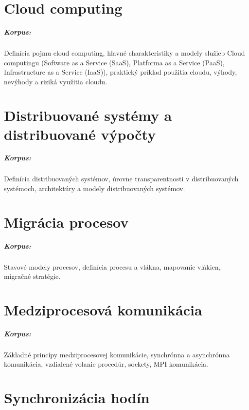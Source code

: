 \documentclass[11pt,a4paper]{report}
\begin{document}
\chapter{Cloud computing}
\paragraph{Korpus:} Definícia pojmu cloud computing, hlavné charakteristiky a modely služieb Cloud computingu (Software as a Service (SaaS), Platforma as a Service (PaaS), Infrastructure as a Service (IaaS)), praktický príklad použitia cloudu, výhody, nevýhody a riziká využitia cloudu.

\chapter{Distribuované systémy a distribuované výpočty}
\paragraph{Korpus:} Definícia distribuovaných systémov, úrovne transparentnosti v distribuovaných systémoch, architektúry a modely distribuovaných systémov. 

\chapter{Migrácia procesov}

\paragraph{Korpus:} Stavové modely procesov, definícia procesu a vlákna, mapovanie vlákien, migračné stratégie.

\chapter{Medziprocesová komunikácia}

\paragraph{Korpus:} Základné princípy medziprocesovej komunikácie, synchrónna a asynchrónna komunikácia, vzdialené volanie procedúr, sockety, MPI komunikácia.

\chapter{Synchronizácia hodín}
\end{document}
